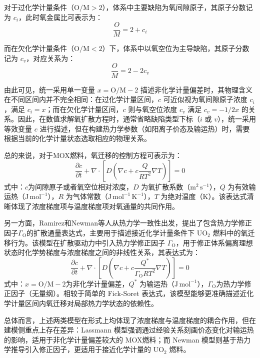对于过化学计量条件（$ \mathrm{O/M} > 2 $），体系中主要缺陷为氧间隙原子，其原子分数记为 $c_i$，此时氧金属比可表示为：
\begin{equation}
	\frac{O}{M} = 2 + c_i
\end{equation}

而在欠化学计量条件（$ \mathrm{O/M} < 2 $）下，体系中以氧空位为主导缺陷，其原子分数记为 $c_v$，对应关系为：
\begin{equation}
	\frac{O}{M} = 2 - 2c_v
\end{equation}

由此可见，统一采用单一变量 $x=\mathrm{O/M}-2$ 描述非化学计量偏差时，其物理含义在不同区间内并不完全相同：在过化学计量区间，$c$ 可近似视为氧间隙原子浓度 $c_i$，满足 $c_i = x$；而在欠化学计量区间，$c$ 则与氧空位浓度 $c_v$ 满足 $c_v=-1/2x$ 的关系。因此，在数值求解氧扩散方程时，通常省略缺陷类型下标（$i$ 或 $v$），统一采用等效变量 $c$ 进行描述，但在构建热力学参数（如阳离子价态及输运热）时，需要根据当前的化学计量状态选取相应的物理关系。

总的来说，对于MOX燃料，氧迁移的控制方程可表示为：
\begin{equation}
	\frac{\partial c}{\partial t} + \nabla \cdot \left[ D \left( \nabla c + c \frac{Q}{R T^2} \nabla T \right) \right] = 0
\end{equation}
\noindent 式中：$c$为间隙原子或者氧空位相对浓度，$D$ 为氧扩散系数（$\mathrm{m^2\,s^{-1}}$），$Q$ 为有效输运热（$\mathrm{J\,mol^{-1}}$），$R$ 为气体常数（$\mathrm{J\,mol^{-1}\,K^{-1}}$），$T$ 为绝对温度（$\mathrm{K}$）。该表达式清晰体现了浓度梯度项与温度梯度项对氧通量的共同作用。

另一方面，Ramirez和Newman等人\cite{ramirezSimulationsHeatOxygen2006,newmanThreeDimensionalCoupled2009}从热力学一致性出发，提出了包含热力学修正因子$\Gamma_{\mathrm O}$的扩散通量表达式，主要用于描述接近化学计量条件下 UO$_2$ 燃料中的氧迁移行为。该模型在扩散驱动力中引入热力学修正因子 $\Gamma_{\mathrm O}$，用于修正体系偏离理想状态时化学势梯度与浓度梯度之间的非线性关系，其表达式为：
\begin{equation}
	\frac{\partial c}{\partial t} + \nabla \cdot \left[ D \left( \nabla c + c \frac{Q^*}{\Gamma_{\mathrm O} R T^2} \nabla T \right) \right] = 0
\end{equation}
\noindent 式中：$x=\mathrm{O/M}-2$为非化学计量偏差，$Q^*$ 为输运热（$\mathrm{J\,mol^{-1}}$），$\Gamma_{\mathrm O}$为热力学修正因子（无量纲）。相较于简单的 Fick-Soret 表达式，该模型能够更准确描述近化学计量区间内氧迁移对局部热力学状态的依赖性。

总体而言，上述两类模型在形式上均体现了浓度梯度与温度梯度的耦合作用，但在建模侧重点上存在差异：Lassmann 模型强调通过经验关系刻画价态变化对输运热的影响，适用于非化学计量偏差较大的 MOX燃料；而 Newman 模型则基于热力学推导引入修正因子，更适用于接近化学计量的 UO$_2$ 燃料。

